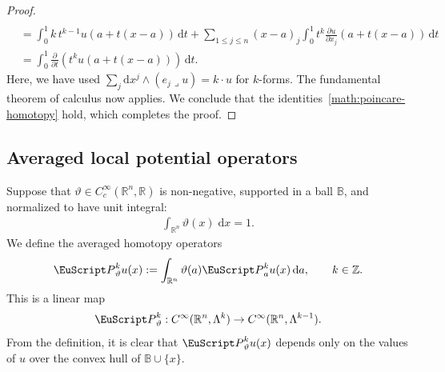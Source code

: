 \documentclass[10pt,a4paper]{amsart}
\theoremstyle{definition}
\theoremstyle{remark}
\numberwithin{equation}{section}
\newcommand{\bbB}{{\mathbb B}}
\newcommand{\bbR}{{\mathbb R}}
\newcommand{\bbZ}{{\mathbb Z}}
\newcommand{\euP}{{\EuScript P}}
\newcommand{\smallball}{\bbB}
\newcommand{\dif}{{\mathrm d}}
\newcommand{\tsum}{{\textstyle{\sum}}}
\newcommand{\contract}{\mathbin{\lrcorner}}
\newcommand{\cartanx}{{\mathrm d}x}
\newcommand{\Alt}[1]{\Lambda^{#1}}
\newcommand{\Poincare}{\euP}
\newcommand{\weight}{\vartheta}
\begin{document}
\begin{proof}
\begin{align*}
        \\&
        =
        \int_{0}^{1} k \, t^{k-1} u\left(a+t(x-a)\right) \,\dif t
        +
        \sum_{1 \leq j \leq n}
        (x-a)_{j}
        \int_{0}^{1} t^{k} \frac{ \partial u }{\partial x_{j}}\left(a+t(x-a)\right) \,\dif t
        \\&
        =
        \int_{0}^{1} 
        \frac{\partial}{\partial t} \left( t^{k} u\left(a+t(x-a)\right) \right) \,\dif t
        .
    \end{align*}
    Here, we have used $\tsum_{j} \cartanx^{j} \wedge (e_{j} \contract u) = k \cdot u$ for $k$-forms. 
    The fundamental theorem of calculus now applies. 
    We conclude that the identities~\eqref{math:poincare-homotopy} hold, which completes the proof. 
\end{proof}




























\subsection{Averaged local potential operators}

Suppose that $\weight \in C^{\infty}_{c}(\bbR^{n},\bbR)$ is non-negative, supported in a ball $\smallball$, and normalized to have unit integral:
\begin{align*}
    \int_{\bbR^{n}} \weight(x) \;\dif x = 1.
\end{align*}
We define the averaged homotopy operators
\begin{align}\label{math:averaged-poincare-operator-definition}
    \Poincare^{k}_{\weight} u(x)
    :=
    \int_{\bbR^{n}} \weight(a) \Poincare^{k}_{a} u(x) \,\dif a
    ,
    \qquad 
    k \in \bbZ
    .
\end{align}
This is a linear map 
\begin{align*}
    \Poincare^{k}_{\weight} : C^{\infty}(\bbR^{n},\Alt{k}) \to C^{\infty}(\bbR^{n},\Alt{k-1})
    .
\end{align*}
From the definition, it is clear that $\Poincare^{k}_{\weight} u(x)$ depends only on the values of $u$ over the convex hull of $\smallball \cup \{x\}$. 
\end{document}
